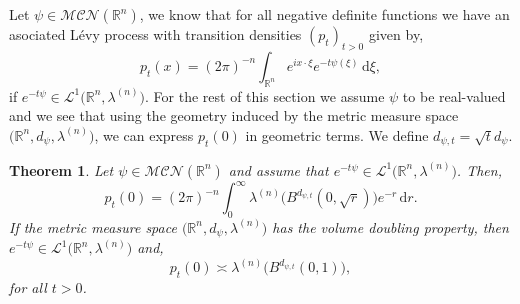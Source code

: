 \documentclass[a4paper, 12pt]{report}
\newtheorem{theorem}{Theorem}[section]
\theoremstyle{cor}
\theoremstyle{remark}
\theoremstyle{definition}
\begin{document}
Let $\psi \in \mathcal{MCN}(\mathbb{R}^n)$, we know that for all negative definite functions we have an asociated L\'evy process with transition densities $(p_t)_{t > 0}$ given by,
$$
p_t(x) = (2\pi)^{-n}\int_{\mathbb{R}^n}e^{ix\cdot\xi}e^{-t\psi(\xi)}\,\mathrm{d}\xi, 
$$
if $e^{-t\psi} \in \mathcal{L}^1\big(\mathbb{R}^n, \lambda^{(n)}\big)$.  For the rest of this section we assume $\psi$ to be real-valued and we see that using the geometry induced by the metric measure space $\big(\mathbb{R}^n, d_\psi, \lambda^{(n)}\big)$, we can express $p_t(0)$ in geometric terms.  We define $d_{\psi, t} = \sqrt{t}d_\psi$.
\begin{theorem}\label{FAaSGRtLPT1}
Let $\psi \in \mathcal{MCN}(\mathbb{R}^n)$ and assume that $e^{-t\psi} \in \mathcal{L}^1\big(\mathbb{R}^n, \lambda^{(n)}\big)$.  Then,
\begin{equation}
p_t(0) = (2\pi)^{-n}\int_0^\infty\lambda^{(n)}\big(B^{d_{\psi, t}}(0, \sqrt{r})\big)e^{-r}\,\mathrm{d}r.
\end{equation}
If the metric measure space $\big(\mathbb{R}^n, d_\psi, \lambda^{(n)}\big)$ has the volume doubling property, then $e^{-t\psi} \in \mathcal{L}^1\big(\mathbb{R}^n, \lambda^{(n)}\big)$ and,
\begin{equation}
p_t(0) \asymp \lambda^{(n)}\big(B^{d_{\psi, t}}(0, 1)\big),
\end{equation}
for all $t > 0$.
\end{theorem}
\end{document}
